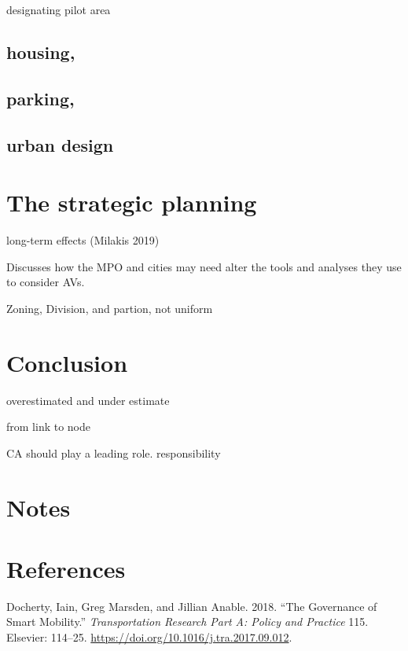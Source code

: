\documentclass[12pt,]{article}
\begin{document}
designating pilot area

\hypertarget{housing}{%
\subsection{housing,}\label{housing}}

\hypertarget{parking}{%
\subsection{parking,}\label{parking}}

\hypertarget{urban-design}{%
\subsection{urban design}\label{urban-design}}

\hypertarget{the-strategic-planning}{%
\section{The strategic planning}\label{the-strategic-planning}}

long-term effects (Milakis 2019)

Discusses how the MPO and cities may need alter the tools and analyses
they use to consider AVs.

Zoning, Division, and partion, not uniform

\hypertarget{conclusion}{%
\section{Conclusion}\label{conclusion}}

overestimated and under estimate

from link to node

CA should play a leading role. responsibility

\hypertarget{notes}{%
\section{Notes}\label{notes}}

\hypertarget{references}{%
\section*{References}\label{references}}

\hypertarget{refs}{}
\leavevmode\hypertarget{ref-docherty2018governance}{}%
Docherty, Iain, Greg Marsden, and Jillian Anable. 2018. ``The Governance
of Smart Mobility.'' \emph{Transportation Research Part A: Policy and
Practice} 115. Elsevier: 114--25.
\url{https://doi.org/10.1016/j.tra.2017.09.012}.
\end{document}

